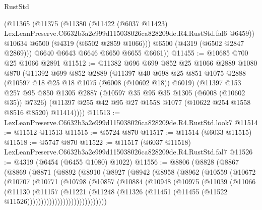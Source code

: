 \begin{lexlean}{RustStd}
\begin{coremodule}
        (@11365
          (@11375
            (@11380
              (@11422
                (@6037 @11423)
                LexLeanPreserve.C6632b3a2e999d115038026ca828209de.R4.RustStd.fal6
                @6459))
            @10634
            @6500
            (@4319 (@6502 @2859 @1066)))
          @6500
          (@4319 (@6502 @2847 @2869)))
        @6640
        @6643
        @6646
        @6650
        @6655
        @6661))
@11455 := @10685 @700 @25 @1066 @2891
@11512 := @11382
    @696
    @699
    @852
    @25
    @1066
    @2889
    @1080
    @870
    (@11392
      @699
      @852
      @2889
      (@11397
        @40
        @698
        @25
        @851
        @1075
        @2888
        (@10597 @18 @25 @18 @1075 (@6008 (@10602 @18)) @6019)
        (@11397
          @153
          @257
          @95
          @850
          @1305
          @2887
          (@10597 @35 @95 @35 @1305 (@6008 (@10602 @35)) @7326)
          (@11397 @255 @42 @95 @27 @1558 @1077 (@10622 @254 @1558 @8516 @8520) @11414))))
@11513 := LexLeanPreserve.C6632b3a2e999d115038026ca828209de.R4.RustStd.look7
@11514 := @11512 @11513
@11515 := @5724 @870
@11517 := @11514 (@6033 @11515)
@11518 := @5747 @870
@11522 := @11517 (@6037 @11518) LexLeanPreserve.C6632b3a2e999d115038026ca828209de.R4.RustStd.fal7
@11526 := @4319 (@6454 (@6455 @1080) @1022)
@11556 := @8806
    (@8828
      (@8867
        (@8869
          (@8871
            (@8892
              (@8910
                (@8927
                  (@8942
                    (@8958
                      (@8962
                        (@10559
                          (@10672
                            (@10707
                              (@10771
                                (@10798
                                  (@10857
                                    (@10884
                                      (@10948
                                        (@10975
                                          (@11039
                                            (@11066
                                              (@11130
                                                (@11157
                                                  (@11221
                                                    (@11248
                                                      (@11326
                                                        (@11451
                                                          (@11455
                                                            (@11522
                                                              @11526)))))))))))))))))))))))))))))

\end{coremodule}
\end{lexlean}
